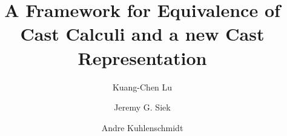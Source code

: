 \documentclass[runningheads]{llncs}
\begin{document}
%
\title{A Framework for Equivalence of Cast Calculi and a new Cast Representation}
%
%
\author{Kuang-Chen Lu \and
Jeremy G. Siek \and
Andre Kuhlenschmidt
}
%
%
%
\maketitle              %
%
\end{document}
